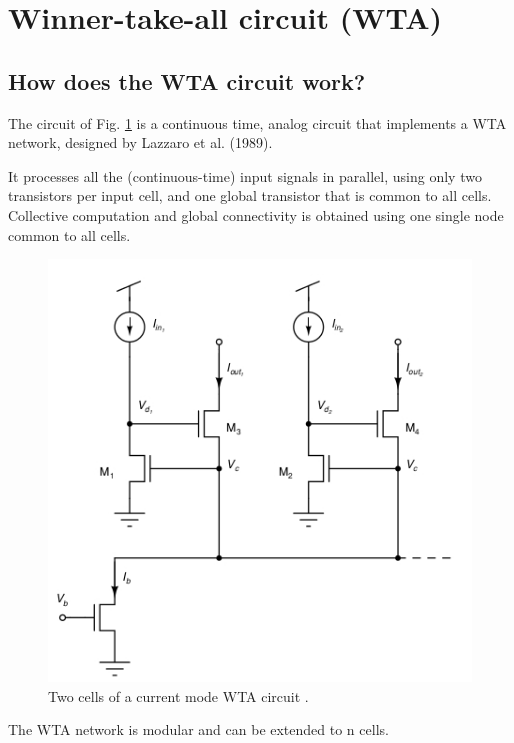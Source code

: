 \documentclass[main]{subfiles}
\begin{document}


\section{Winner-take-all circuit (WTA)}
\subsection{How does the WTA circuit work?}

The circuit of Fig. \ref{fig:WTA} is a continuous time, analog circuit that implements
a WTA network, designed by Lazzaro et al. (1989).

It processes all the (continuous-time) input signals in
parallel, using only two transistors per input cell, and one global transistor
that is common to all cells. Collective computation and global connectivity is
obtained using one single node common to all cells.

\begin{figure}[htbp]
  \centering
  \includegraphics[scale=0.8]{pics/WTA.jpg}
  \caption{Two cells of a current mode WTA circuit \cite{book:VLSI}.}
  \label{fig:WTA}
\end{figure} 

The WTA network is modular and can be extended to n cells. 
\end{document}
